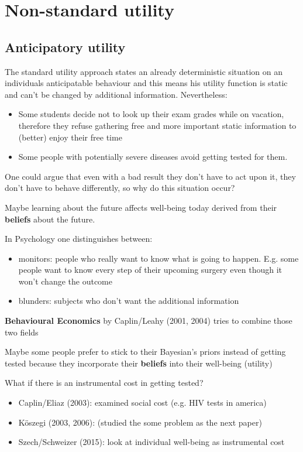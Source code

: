 
\chapter{Non-standard utility}


\section*{Anticipatory utility} 

The standard utility approach states an already deterministic situation on an individuals anticipatable behaviour and this means his utility function is static and can't be changed by additional information. Nevertheless:

\begin{itemize}
	\item Some students decide not to look up their exam grades while on vacation, therefore they refuse gathering free and more important static information to (better) enjoy their free time
	\item Some people with potentially severe diseases avoid getting tested for them.
\end{itemize}

One could argue that even with a bad result they don't have to act upon it, they don't have to behave differently, so why do this situation occur? 

Maybe learning about the future affects well-being today derived from their \textbf{beliefs} about the future.

In Psychology one distinguishes between:
\begin{itemize}
	\item monitors: people who really want to know what is going to happen. E.g. some people want to know every step of their upcoming surgery even though it won't change the outcome
	\item blunders: subjects who don't want the additional information
\end{itemize}

\textbf{Behavioural Economics} by Caplin/Leahy (2001, 2004) tries to combine those two fields

Maybe some people prefer to stick to their Bayesian's priors instead of getting tested because they incorporate their \textbf{beliefs} into their well-being (utility)
~\newline

What if there is an instrumental cost in getting tested?
\begin{itemize}
	\item Caplin/Eliaz (2003): examined social cost (e.g. HIV tests in america)
	\item Köszegi (2003, 2006): (studied the some problem as the next paper)
	\item Szech/Schweizer (2015): look at individual well-being as instrumental cost
\end{itemize}

